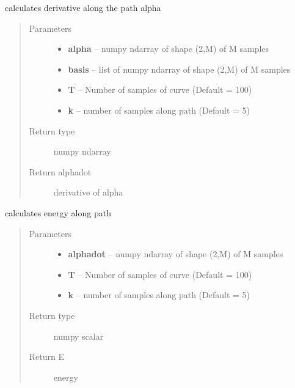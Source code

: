 \documentclass[letterpaper,10pt,english]{sphinxmanual}
\begin{document}
\begin{fulllineitems}
\label{geodesic:geodesic.calc_alphadot}
calculates derivative along the path alpha
\begin{quote}\begin{description}
\item[{Parameters}] \leavevmode\begin{itemize}
\item {} 
\textbf{alpha} -- numpy ndarray of shape (2,M) of M samples

\item {} 
\textbf{basis} -- list of numpy ndarray of shape (2,M) of M samples

\item {} 
\textbf{T} -- Number of samples of curve (Default = 100)

\item {} 
\textbf{k} -- number of samples along path (Default = 5)

\end{itemize}

\item[{Return type}] \leavevmode
numpy ndarray

\item[{Return alphadot}] \leavevmode
derivative of alpha

\end{description}\end{quote}

\end{fulllineitems}


\begin{fulllineitems}
\label{geodesic:geodesic.calculate_energy}
calculates energy along path
\begin{quote}\begin{description}
\item[{Parameters}] \leavevmode\begin{itemize}
\item {} 
\textbf{alphadot} -- numpy ndarray of shape (2,M) of M samples

\item {} 
\textbf{T} -- Number of samples of curve (Default = 100)

\item {} 
\textbf{k} -- number of samples along path (Default = 5)

\end{itemize}

\item[{Return type}] \leavevmode
numpy scalar

\item[{Return E}] \leavevmode
energy

\end{description}\end{quote}

\end{fulllineitems}
\end{document}
